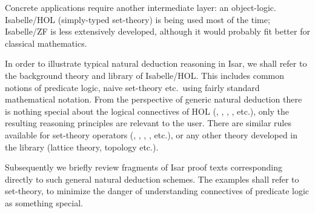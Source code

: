 \begin{isabellebody}
\begin{isamarkuptext}
  Concrete applications require another intermediate layer: an
  object-logic.  Isabelle/HOL \cite{isa-tutorial} (simply-typed
  set-theory) is being used most of the time; Isabelle/ZF
  \cite{isabelle-ZF} is less extensively developed, although it would
  probably fit better for classical mathematics.

  \medskip In order to illustrate typical natural deduction reasoning
  in Isar, we shall refer to the background theory and library of
  Isabelle/HOL.  This includes common notions of predicate logic,
  naive set-theory etc.\ using fairly standard mathematical notation.
  From the perspective of generic natural deduction there is nothing
  special about the logical connectives of HOL (\isa{{\isachardoublequote}{\isasymand}{\isachardoublequote}}, \isa{{\isachardoublequote}{\isasymor}{\isachardoublequote}}, \isa{{\isachardoublequote}{\isasymforall}{\isachardoublequote}}, \isa{{\isachardoublequote}{\isasymexists}{\isachardoublequote}}, etc.), only the resulting reasoning
  principles are relevant to the user.  There are similar rules
  available for set-theory operators (\isa{{\isachardoublequote}{\isasyminter}{\isachardoublequote}}, \isa{{\isachardoublequote}{\isasymunion}{\isachardoublequote}}, \isa{{\isachardoublequote}{\isasymInter}{\isachardoublequote}}, \isa{{\isachardoublequote}{\isasymUnion}{\isachardoublequote}}, etc.), or any other theory developed in the
  library (lattice theory, topology etc.).

  Subsequently we briefly review fragments of Isar proof texts
  corresponding directly to such general natural deduction schemes.
  The examples shall refer to set-theory, to minimize the danger of
  understanding connectives of predicate logic as something special.


\end{isamarkuptext}
\end{isabellebody}

